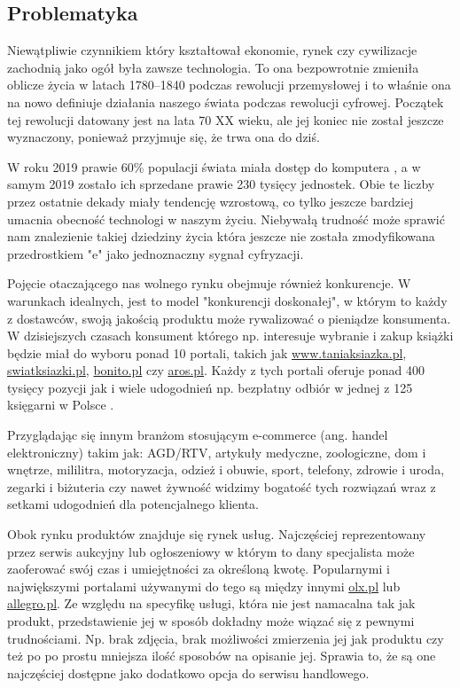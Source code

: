 \documentclass[12pt]{article}
\numberwithin{figure}{section}
\begin{document}
\subsection{Problematyka} \label{sec:problematyka}
Niewątpliwie czynnikiem który kształtował ekonomie, rynek czy cywilizacje zachodnią jako ogół była zawsze technologia. To ona bezpowrotnie zmieniła oblicze życia w latach 1780–1840 podczas rewolucji przemysłowej i to właśnie ona na nowo definiuje działania naszego świata podczas rewolucji cyfrowej. Początek tej rewolucji datowany jest na lata 70 XX wieku, ale jej koniec nie został jeszcze wyznaczony, ponieważ przyjmuje się, że trwa ona do dziś.

W roku 2019 prawie 60\% populacji świata miała dostęp do komputera \cite{internet-users}, a w samym 2019 zostało ich sprzedane prawie 230 tysięcy jednostek\cite{computers}. Obie te liczby przez ostatnie dekady miały tendencję wzrostową, co tylko jeszcze bardziej umacnia obecność technologi w naszym życiu. Niebywałą trudność może sprawić nam znalezienie takiej dziedziny życia która jeszcze nie została zmodyfikowana przedrostkiem "e" jako jednoznaczny sygnał cyfryzacji.

Pojęcie otaczającego nas wolnego rynku obejmuje również konkurencje. W warunkach idealnych, jest to model "konkurencji doskonałej", w którym to każdy z dostawców, swoją jakością produktu może rywalizować o pieniądze konsumenta. W dzisiejszych czasach konsument którego np. interesuje wybranie i zakup książki będzie miał do wyboru ponad 10 portali, takich jak \url{www.taniaksiazka.pl}, \url{swiatksiazki.pl}, \url{bonito.pl} czy \url{aros.pl}. Każdy z tych portali oferuje ponad 400 tysięcy pozycji jak i wiele udogodnień np. bezpłatny odbiór w jednej z 125 księgarni w Polsce \cite{ranking}. 

Przyglądając się innym branżom stosującym e-commerce (ang. handel elektroniczny) takim jak: AGD/RTV, artykuły medyczne, zoologiczne, dom i wnętrze, mililitra, motoryzacja, odzież i obuwie, sport, telefony, zdrowie i uroda, zegarki i biżuteria czy nawet żywność widzimy bogatość tych rozwiązań wraz z setkami udogodnień dla potencjalnego klienta. 

Obok rynku produktów znajduje się rynek usług. Najczęściej reprezentowany przez serwis aukcyjny lub ogłoszeniowy w którym to dany specjalista może zaoferować swój czas i umiejętności za określoną kwotę. Popularnymi i największymi portalami używanymi do tego są między innymi \url{olx.pl} lub \url{allegro.pl}.
Ze względu na specyfikę usługi, która nie jest namacalna tak jak produkt, przedstawienie jej w sposób dokładny może wiązać się z pewnymi trudnościami. Np. brak zdjęcia, brak możliwości zmierzenia jej jak produktu czy też po po prostu mniejsza ilość sposobów na opisanie jej. Sprawia to, że są one najczęściej dostępne jako dodatkowo opcja do serwisu handlowego. 
\end{document}
